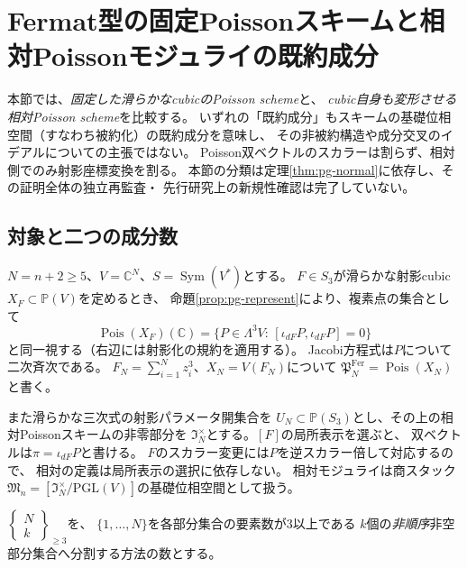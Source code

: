 \section{Fermat型の固定Poissonスキームと相対Poissonモジュライの既約成分}
\label{sec:pg-fermat-relative-components}
本節では、\emph{固定した滑らかなcubicのPoisson scheme}と、
\emph{cubic自身も変形させる相対Poisson scheme}を比較する。
いずれの「既約成分」もスキームの基礎位相空間（すなわち被約化）の既約成分を意味し、
その非被約構造や成分交叉のイデアルについての主張ではない。
Poisson双ベクトルのスカラーは割らず、相対側でのみ射影座標変換を割る。
本節の分類は定理\ref{thm:pg-normal}に依存し、その証明全体の独立再監査・
先行研究上の新規性確認は完了していない。

\subsection{対象と二つの成分数}
$N=n+2\ge5$、$V=\mathbb C^N$、$S=\operatorname{Sym}(V^*)$とする。
$F\in S_3$が滑らかな射影cubic $X_F\subset\mathbb P(V)$を定めるとき、
命題\ref{prop:pg-represent}により、複素点の集合として
\[
 \operatorname{Pois}(X_F)(\mathbb C)=
 \{P\in\Lambda^3V:\,[\iota_{dF}P,\iota_{dF}P]=0\}
\]
と同一視する（右辺には射影化の規約を適用する）。
Jacobi方程式は$P$について二次斉次である。
$F_N=\sum_{i=1}^N z_i^3$、$X_N=V(F_N)$について
$\mathfrak P_N^{\mathrm{Fer}}=\operatorname{Pois}(X_N)$と書く。

また滑らかな三次式の射影パラメータ開集合を
$U_N\subset\mathbb P(S_3)$とし、その上の相対Poissonスキームの非零部分を
$\mathfrak I_N^\times$とする。$[F]$の局所表示を選ぶと、
双ベクトルは$\pi=\iota_{dF}P$と書ける。
$F$のスカラー変更には$P$を逆スカラー倍して対応するので、
相対の定義は局所表示の選択に依存しない。
相対モジュライは商スタック
$\mathfrak M_n=[\mathfrak I_N^\times/\mathrm{PGL}(V)]$の基礎位相空間として扱う。

$\left\{\begin{smallmatrix}N\\k\end{smallmatrix}\right\}_{\ge3}$を、
$\{1,\ldots,N\}$を各部分集合の要素数が$3$以上である
$k$個の\emph{非順序}非空部分集合へ分割する方法の数とする。

